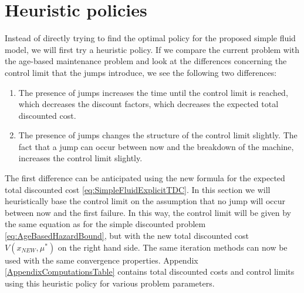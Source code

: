 \section{Heuristic policies}
Instead of directly trying to find the optimal policy for the proposed simple fluid model, we will first try a heuristic policy.
If we compare the current problem with the age-based maintenance problem and look at the differences concerning the control limit that the jumps introduce, we see the following two differences:
\begin{enumerate}
	\item The presence of jumps increases the time until the control limit is reached, which decreases the discount factors, which decreases the expected total discounted cost.
	\item The presence of jumps changes the structure of the control limit slightly.
	The fact that a jump can occur between now and the breakdown of the machine, increases the control limit slightly.
\end{enumerate}
The first difference can be anticipated using the new formula for the expected total discounted cost \eqref{eq:SimpleFluidExplicitTDC}.
In this section we will heuristically base the control limit on the assumption that no jump will occur between now and the first failure.
In this way, the control limit will be given by the same equation as for the simple discounted problem \eqref{eq:AgeBasedHazardBound}, but with the new total discounted cost $V(x_{NEW},\mu^*)$ on the right hand side.
The same iteration methods can now be used with the same convergence properties.
Appendix \ref{AppendixComputationsTable} contains total discounted costs and control limits using this heuristic policy for various problem parameters.